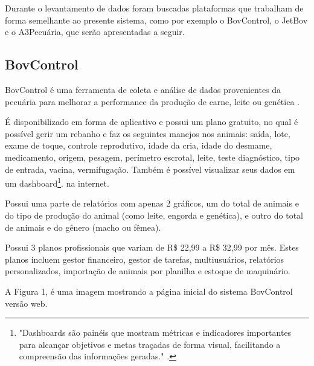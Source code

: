 \documentclass[12pt]{article}
\begin{document}

Durante o levantamento de dados foram buscadas plataformas que trabalham de forma semelhante ao presente sistema, como por exemplo o BovControl, o JetBov e o A3Pecuária, que serão apresentadas a seguir.

\subsection{BovControl}

BovControl é uma ferramenta de coleta e análise de dados provenientes da pecuária para melhorar a performance da produção de carne, leite ou genética \cite{bovcontrol10}. 

É disponibilizado em forma de aplicativo e possui um plano gratuito, no qual é possível gerir um rebanho e faz os seguintes manejos nos animais: saída, lote, exame de toque, controle reprodutivo, idade da cria, idade do desmame, medicamento, origem, pesagem, perímetro escrotal, leite, teste diagnóstico, tipo de entrada, vacina, vermifugação. Também é possível visualizar seus dados em um dashboard\footnote{"Dashboards são painéis que mostram métricas e indicadores importantes para alcançar objetivos e metas traçadas de forma visual, facilitando a compreensão das informações geradas." \cite{nascimento17}.}. na internet.

Possui uma parte de relatórios com apenas 2 gráficos, um do total de animais e do tipo de produção do animal (como leite, engorda e genética), e outro do total de animais e do gênero (macho ou fêmea). 

Possui 3 planos profissionais que variam de R\$ 22,99 a R\$ 32,99 por mês. Estes planos incluem gestor financeiro, gestor de tarefas, multiusuários, relatórios personalizados, importação de animais por planilha e estoque de maquinário.  

A Figura 1, é uma imagem mostrando a página inicial do sistema BovControl versão web.
\end{document}
